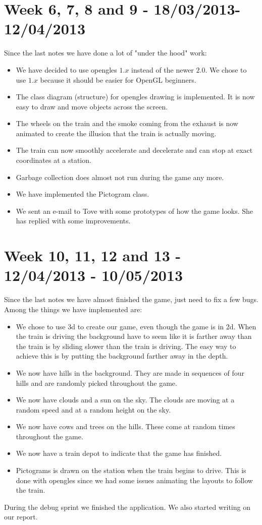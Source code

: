 \section*{Week 6, 7, 8 and 9 - 18/03/2013-12/04/2013}
Since the last notes we have done a lot of "under the hood" work:

\begin{itemize}
\item We have decided to use \ac{opengles} $1.x$ instead of the newer $2.0$. We chose to use $1.x$ because it should be easier for OpenGL beginners. 
\item The class diagram (structure) for \ac{opengles} drawing is implemented. It is now easy to draw and move objects across the screen. 
\item The wheels on the train and the smoke coming from the exhaust is now animated to create the illusion that the train is actually moving. 
\item The train can now smoothly accelerate and decelerate and can stop at exact coordinates at a station. 
\item Garbage collection does almost not run during the game any more.
\item We have implemented the Pictogram class.
\item We sent an e-mail to Tove with some prototypes of how the game looks. She has replied with some improvements.
\end{itemize} 

\section*{Week 10, 11, 12 and 13 - 12/04/2013 - 10/05/2013}
Since the last notes we have almost finished the game, just need to fix a few bugs. Among the things we have implemented are:

\begin{itemize}
\item We chose to use \ac{3d} to create our game, even though the game is in \ac{2d}. When the train is driving the background have to seem like it is farther away than the train is by sliding slower than the train is driving. The easy way to achieve this is by putting the background farther away in the depth.
\item We now have hills in the background. They are made in sequences of four hills and are randomly picked throughout the game. 
\item We now have clouds and a sun on the sky. The clouds are moving at a random speed and at a random height on the sky. 
\item We now have cows and trees on the hills. These come at random times throughout the game.
\item We now have a train depot to indicate that the game has finished.
\item Pictograms is drawn on the station when the train begins to drive. This is done with \ac{opengles} since we had some issues animating the layouts to follow the train.  
\end{itemize}
During the debug sprint we finished the application. We also started writing on our report. 

